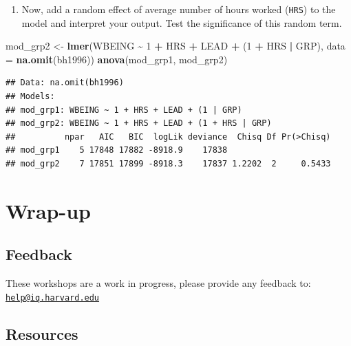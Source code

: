 \documentclass[
]{book}
\newenvironment{Shaded}{\begin{snugshade}}{\end{snugshade}}
\newcommand{\DataTypeTok}[1]{\textcolor[rgb]{0.13,0.29,0.53}{#1}}
\newcommand{\DecValTok}[1]{\textcolor[rgb]{0.00,0.00,0.81}{#1}}
\newcommand{\KeywordTok}[1]{\textcolor[rgb]{0.13,0.29,0.53}{\textbf{#1}}}
\newcommand{\NormalTok}[1]{#1}
\newcommand{\OperatorTok}[1]{\textcolor[rgb]{0.81,0.36,0.00}{\textbf{#1}}}
\newcommand{\StringTok}[1]{\textcolor[rgb]{0.31,0.60,0.02}{#1}}
\providecommand{\tightlist}{%
  \setlength{\itemsep}{0pt}\setlength{\parskip}{0pt}}
\begin{document}
\begin{alert}
\begin{enumerate}
\def\labelenumi{\arabic{enumi}.}
\setcounter{enumi}{2}
\tightlist
\item
  Now, add a random effect of average number of hours worked (\texttt{HRS}) to the model and interpret your output. Test the significance of this random term.
\end{enumerate}

\begin{Shaded}
\begin{Highlighting}[]
\NormalTok{  mod\_grp2 \textless{}{-}}\StringTok{ }\KeywordTok{lmer}\NormalTok{(WBEING }\OperatorTok{\textasciitilde{}}\StringTok{ }\DecValTok{1} \OperatorTok{+}\StringTok{ }\NormalTok{HRS }\OperatorTok{+}\StringTok{ }\NormalTok{LEAD }\OperatorTok{+}\StringTok{ }\NormalTok{(}\DecValTok{1} \OperatorTok{+}\StringTok{ }\NormalTok{HRS }\OperatorTok{|}\StringTok{ }\NormalTok{GRP), }\DataTypeTok{data =} \KeywordTok{na.omit}\NormalTok{(bh1996))}
  \KeywordTok{anova}\NormalTok{(mod\_grp1, mod\_grp2)}
\end{Highlighting}
\end{Shaded}

\begin{verbatim}
## Data: na.omit(bh1996)
## Models:
## mod_grp1: WBEING ~ 1 + HRS + LEAD + (1 | GRP)
## mod_grp2: WBEING ~ 1 + HRS + LEAD + (1 + HRS | GRP)
##          npar   AIC   BIC  logLik deviance  Chisq Df Pr(>Chisq)
## mod_grp1    5 17848 17882 -8918.9    17838                     
## mod_grp2    7 17851 17899 -8918.3    17837 1.2202  2     0.5433
\end{verbatim}

\end{alert}

\hypertarget{wrap-up-2}{%
\section{Wrap-up}\label{wrap-up-2}}

\hypertarget{feedback-2}{%
\subsection{Feedback}\label{feedback-2}}

These workshops are a work in progress, please provide any feedback to: \href{mailto:help@iq.harvard.edu}{\nolinkurl{help@iq.harvard.edu}}

\hypertarget{resources-3}{%
\subsection{Resources}\label{resources-3}}
\end{document}
